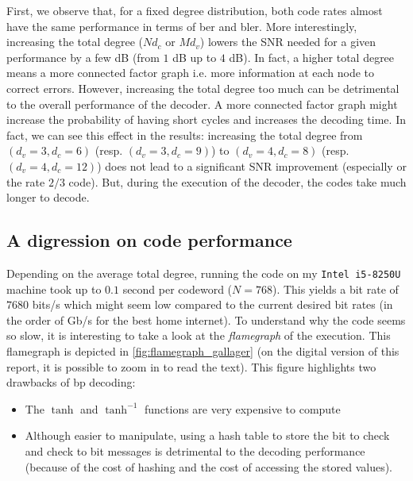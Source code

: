 First, we observe that, for a fixed degree distribution, both code rates almost
have the same performance in terms of \acrshort{ber} and \acrshort{bler}. More
interestingly, increasing the total degree ($N d_c$ or $M d_v$) lowers the SNR
needed for a given performance by a few dB (from $1$ dB up to $4$ dB). In fact,
a higher total degree means a more connected factor graph i.e. more information
at each node to correct errors. However, increasing the total degree too much
can be detrimental to the overall performance of the decoder. A more connected
factor graph might increase the probability of having short cycles and increases
the decoding time. In fact, we can see this effect in the results: increasing
the total degree from $(d_v=3, d_c=6)$ (resp.  $(d_v=3, d_c=9)$) to $(d_v=4,
    d_c=8)$ (resp.  $(d_v=4, d_c=12)$) does not lead to a significant SNR
improvement (especially or the rate $2/3$ code). But, during the execution of
the decoder, the codes take much longer to decode.


\subsection{A digression on code performance}

Depending on the average total degree, running the code on my \texttt{Intel
    i5-8250U} machine took up to $0.1$ second per codeword ($N = 768$). This
yields a bit rate of $7680$ bits/s which might seem low compared to the
current desired bit rates (in the order of Gb/s for the best home internet).
To understand why the code seems so slow, it is interesting to take a look
at the \textit{flamegraph} of the execution. This flamegraph is depicted in
\autoref{fig:flamegraph_gallager} (on the digital version of this report, it
is possible to zoom in to read the text). This figure highlights two
drawbacks of \acrshort{bp} decoding:

\begin{itemize}
    \item The $\tanh$ and $\tanh^{-1}$ functions are very expensive to compute
    \item Although easier to manipulate, using a hash table to store the bit to
          check and check to bit messages is detrimental to the decoding
          performance (because of the cost of hashing and the cost of accessing
          the stored values).
\end{itemize}

